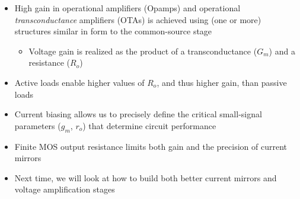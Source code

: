 \documentclass[11pt]{article}
\providecommand{\tightlist}{%
      \setlength{\itemsep}{0pt}\setlength{\parskip}{0pt}}
\begin{document}
    \begin{itemize}
\tightlist
\item
  High gain in operational amplifiers (Opamps) and operational
  \emph{transconductance} amplifiers (OTAs) is achieved using (one or
  more) structures similar in form to the common-source stage

  \begin{itemize}
  \tightlist
  \item
    Voltage gain is realized as the product of a transconductance
    (\(G_m\)) and a resistance (\(R_o\))
  \end{itemize}
\item
  Active loads enable higher values of \(R_o\), and thus higher gain,
  than passive loads
\item
  Current biasing allows us to precisely define the critical
  small-signal parameters (\(g_m\), \(r_o\)) that determine circuit
  performance
\item
  Finite MOS output resistance limits both gain and the precision of
  current mirrors
\item
  Next time, we will look at how to build both better current mirrors
  and voltage amplification stages
\end{itemize}


    
    
    
\end{document}
